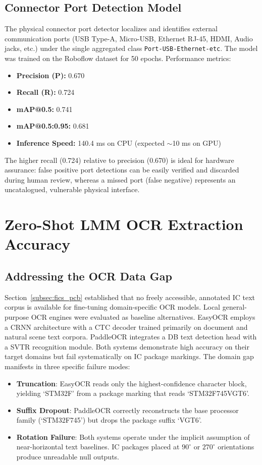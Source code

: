 \documentclass[12pt,a4paper]{report}
\begin{document}
\subsection{Connector Port Detection Model}
The physical connector port detector localizes and identifies external communication ports (USB Type-A, Micro-USB, Ethernet RJ-45, HDMI, Audio jacks, etc.) under the single aggregated class \texttt{Port-USB-Ethernet-etc}. The model was trained on the Roboflow  dataset for 50 epochs. Performance metrics:
\begin{itemize}
  \item \textbf{Precision (P):} 0.670
  \item \textbf{Recall (R):} 0.724
  \item \textbf{mAP@0.5:} 0.741
  \item \textbf{mAP@0.5:0.95:} 0.681
  \item \textbf{Inference Speed:} 140.4 ms on CPU (expected $\sim$10 ms on GPU)
\end{itemize}

The higher recall (0.724) relative to precision (0.670) is ideal for hardware assurance: false positive port detections can be easily verified and discarded during human review, whereas a missed port (false negative) represents an uncatalogued, vulnerable physical interface.

\section{Zero-Shot LMM OCR Extraction Accuracy}
\label{sec:ocr_accuracy}

\subsection{Addressing the OCR Data Gap}
Section~\ref{subsec:fics_pcb} established that no freely accessible, annotated IC text corpus is available for fine-tuning domain-specific OCR models. Local general-purpose OCR engines were evaluated as baseline alternatives. EasyOCR employs a CRNN architecture with a CTC decoder trained primarily on document and natural scene text corpora. PaddleOCR integrates a DB text detection head with a SVTR recognition module. Both systems demonstrate high accuracy on their target domains but fail systematically on IC package markings. The domain gap manifests in three specific failure modes:

\begin{itemize}
  \item \textbf{Truncation}: EasyOCR reads only the highest-confidence character block, yielding `STM32F' from a package marking that reads `STM32F745VGT6'.
  \item \textbf{Suffix Dropout}: PaddleOCR correctly reconstructs the base processor family (`STM32F745') but drops the package suffix `VGT6'.
  \item \textbf{Rotation Failure}: Both systems operate under the implicit assumption of near-horizontal text baselines. IC packages placed at $90^{\circ}$ or $270^{\circ}$ orientations produce unreadable null outputs.
\end{itemize}
\end{document}

